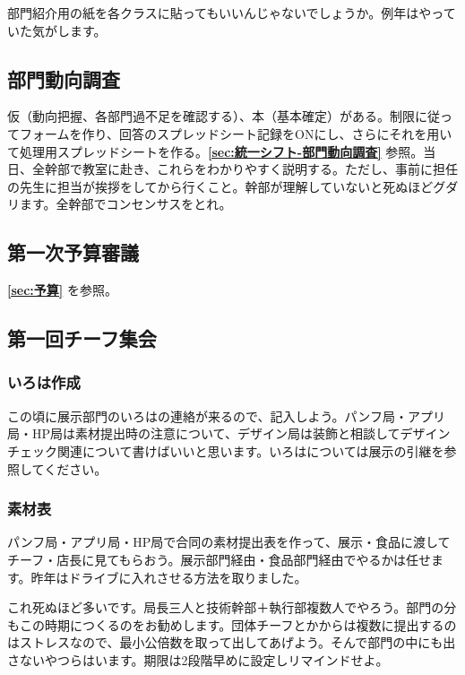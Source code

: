 \documentclass[a4paper]{ltjsreport}
\begin{document}
部門紹介用の紙を各クラスに貼ってもいいんじゃないでしょうか。例年はやっていた気がします。


\subsection{部門動向調査}
仮（動向把握、各部門過不足を確認する）、本（基本確定）がある。制限に従ってフォームを作り、回答のスプレッドシート記録をONにし、さらにそれを用いて処理用スプレッドシートを作る。{\bfseries \ref{sec:統一シフト-部門動向調査}} 参照。当日、全幹部で教室に赴き、これらをわかりやすく説明する。ただし、事前に担任の先生に担当が挨拶をしてから行くこと。幹部が理解していないと死ぬほどグダリます。全幹部でコンセンサスをとれ。

\subsection{第一次予算審議}
{\bfseries \ref{sec:予算}} を参照。

\subsection{第一回チーフ集会}\label{sec:第一回チーフ集会}
\subsubsection{いろは作成}
この頃に展示部門のいろはの連絡が来るので、記入しよう。パンフ局・アプリ局・HP局は素材提出時の注意について、デザイン局は装飾と相談してデザインチェック関連について書けばいいと思います。いろはについては展示の引継を参照してください。

\subsubsection{素材表}
パンフ局・アプリ局・HP局で合同の素材提出表を作って、展示・食品に渡してチーフ・店長に見てもらおう。展示部門経由・食品部門経由でやるかは任せます。昨年はドライブに入れさせる方法を取りました。

これ死ぬほど多いです。局長三人と技術幹部＋執行部複数人でやろう。部門の分もこの時期につくるのをお勧めします。団体チーフとかからは複数に提出するのはストレスなので、最小公倍数を取って出してあげよう。そんで部門の中にも出さないやつらはいます。期限は2段階早めに設定しリマインドせよ。
\end{document}
